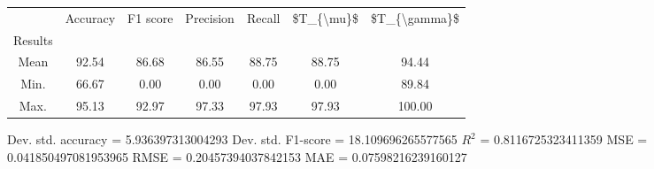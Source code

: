 \begin{tabular}{|c|c|c|c|c|c|c|}
\toprule
{} &  Accuracy &  F1 score &  Precision &  Recall &  \$T\_\{\textbackslash mu\}\$ &  \$T\_\{\textbackslash gamma\}\$ \\
Results &           &           &            &         &            &               \\
\hline
Mean    &     92.54 &     86.68 &      86.55 &   88.75 &      88.75 &         94.44 \\
Min.    &     66.67 &      0.00 &       0.00 &    0.00 &       0.00 &         89.84 \\
Max.    &     95.13 &     92.97 &      97.33 &   97.93 &      97.93 &        100.00 \\
\bottomrule
\end{tabular}

 Dev. std. accuracy = 5.936397313004293
 Dev. std. F1-score = 18.109696265577565
 $R^2$ = 0.8116725323411359
 MSE = 0.041850497081953965
 RMSE = 0.20457394037842153
 MAE = 0.07598216239160127